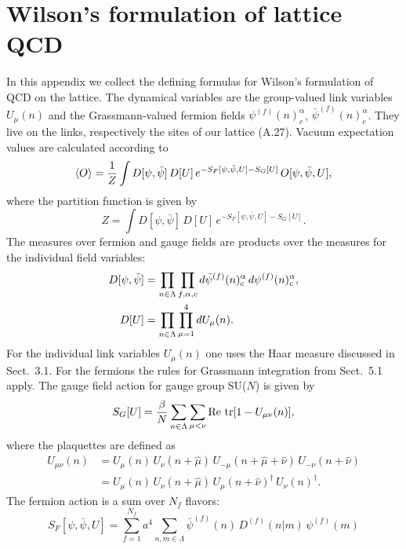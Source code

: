 \section{Wilson's formulation of lattice QCD}

In this appendix we collect the defining formulas for Wilson's formulation of
QCD on the lattice. The dynamical variables are the group-valued link
variables $U_\mu(n)$ and the Grassmann-valued fermion fields
$\psi^{(f)}(n)^\alpha_c$, $\bar{\psi}^{(f)}(n)^\alpha_c$. They live on the
links, respectively the sites of our lattice (A.27). Vacuum expectation values
are calculated according to
\begin{equation}
  \left\langle O \right\rangle = \frac{1}{Z}\int D[\psi,\bar{\psi}]\,D[U]\,
  e^{-S_F[\psi,\bar{\psi},U]-S_G[U]}\,O[\psi,\bar{\psi},U],
\end{equation}
where the partition function is given by
\begin{equation}
  Z = \int D[\psi,\bar{\psi}]\,D[U]\,
  e^{-S_F[\psi,\bar{\psi},U]-S_G[U]} .
\end{equation}
The measures over fermion and gauge fields are products over the measures for
the individual field variables:
\begin{align}
  D[\psi,\bar{\psi}] &= \prod_{n\in\Lambda}\prod_{f,\alpha,c}
  d\bar{\psi}^{(f)}(n)^\alpha_c\,d\psi^{(f)}(n)^\alpha_c, \notag\\
  D[U] &= \prod_{n\in\Lambda}\prod_{\mu=1}^{4} dU_\mu(n).
\end{align}
For the individual link variables $U_\mu(n)$ one uses the Haar measure discussed
in Sect.~3.1. For the fermions the rules for Grassmann integration from
Sect.~5.1 apply. The gauge field action for gauge group SU($N$) is given by
\begin{equation}
  S_G[U] = \frac{\beta}{N}\sum_{n\in\Lambda}\sum_{\mu<\nu}\operatorname{Re}\,\operatorname{tr}[1 - U_{\mu\nu}(n)],
\end{equation}
where the plaquettes are defined as
\begin{equation}
  \begin{split}
    U_{\mu\nu}(n) &= U_\mu(n)\,U_\nu(n+\hat{\mu})\,U_{-\mu}(n+\hat{\mu}+\hat{\nu})\,U_{-\nu}(n+\hat{\nu})\\
    &= U_\mu(n)\,U_\nu(n+\hat{\mu})\,U_\mu(n+\hat{\nu})^\dagger\,U_\nu(n)^\dagger .
  \end{split}
\end{equation}
The fermion action is a sum over $N_f$ flavors:
\begin{equation}
  S_F[\psi,\bar{\psi},U] = \sum_{f=1}^{N_f}a^4\sum_{n,m\in\Lambda}
  \bar{\psi}^{(f)}(n)\,D^{(f)}(n|m)\,\psi^{(f)}(m)
\end{equation}
